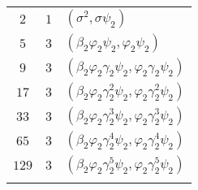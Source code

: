 \tablelasttail{\hline}
\begin{supertabular}{|c|c|p{9cm}|}
$2$
&$1$ &$(\sigma^{2},\sigma\psi_2)$\\
$5$
&$3$ &$(\beta_2\varphi_2\psi_2,\varphi_2\psi_2)$\\
$9$
&$3$ &$(\beta_2\varphi_2\gamma_2\psi_2,\varphi_2\gamma_2\psi_2)$\\
$17$
&$3$ &$(\beta_2\varphi_2\gamma_2^{2}\psi_2,\varphi_2\gamma_2^{2}\psi_2)$\\
$33$
&$3$ &$(\beta_2\varphi_2\gamma_2^{3}\psi_2,\varphi_2\gamma_2^{3}\psi_2)$\\
$65$
&$3$ &$(\beta_2\varphi_2\gamma_2^{4}\psi_2,\varphi_2\gamma_2^{4}\psi_2)$\\
$129$
&$3$ &$(\beta_2\varphi_2\gamma_2^{5}\psi_2,\varphi_2\gamma_2^{5}\psi_2)$\\
&&\\\end{supertabular}